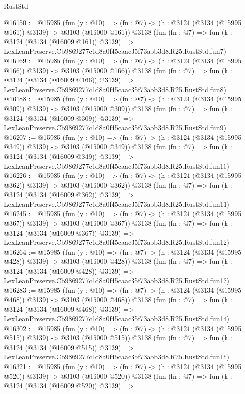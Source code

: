 \begin{lexlean}{RustStd}
\begin{coremodule}
@16150 := @15985
    (fun (y : @10) => (fn : @7) -> (h : @3124 (@3134 (@15995 @161)) @3139) -> @3103 (@16000 @161))
    @3138
    (fun (fn : @7) =>
    fun (h : @3124 (@3134 (@16009 @161)) @3139) =>
    LexLeanPreserve.Cb9869277c1d8a0f45caac35f73abb3d8.R25.RustStd.fun7)
@16169 := @15985
    (fun (y : @10) => (fn : @7) -> (h : @3124 (@3134 (@15995 @166)) @3139) -> @3103 (@16000 @166))
    @3138
    (fun (fn : @7) =>
    fun (h : @3124 (@3134 (@16009 @166)) @3139) =>
    LexLeanPreserve.Cb9869277c1d8a0f45caac35f73abb3d8.R25.RustStd.fun8)
@16188 := @15985
    (fun (y : @10) => (fn : @7) -> (h : @3124 (@3134 (@15995 @309)) @3139) -> @3103 (@16000 @309))
    @3138
    (fun (fn : @7) =>
    fun (h : @3124 (@3134 (@16009 @309)) @3139) =>
    LexLeanPreserve.Cb9869277c1d8a0f45caac35f73abb3d8.R25.RustStd.fun9)
@16207 := @15985
    (fun (y : @10) => (fn : @7) -> (h : @3124 (@3134 (@15995 @349)) @3139) -> @3103 (@16000 @349))
    @3138
    (fun (fn : @7) =>
    fun (h : @3124 (@3134 (@16009 @349)) @3139) =>
    LexLeanPreserve.Cb9869277c1d8a0f45caac35f73abb3d8.R25.RustStd.fun10)
@16226 := @15985
    (fun (y : @10) => (fn : @7) -> (h : @3124 (@3134 (@15995 @362)) @3139) -> @3103 (@16000 @362))
    @3138
    (fun (fn : @7) =>
    fun (h : @3124 (@3134 (@16009 @362)) @3139) =>
    LexLeanPreserve.Cb9869277c1d8a0f45caac35f73abb3d8.R25.RustStd.fun11)
@16245 := @15985
    (fun (y : @10) => (fn : @7) -> (h : @3124 (@3134 (@15995 @367)) @3139) -> @3103 (@16000 @367))
    @3138
    (fun (fn : @7) =>
    fun (h : @3124 (@3134 (@16009 @367)) @3139) =>
    LexLeanPreserve.Cb9869277c1d8a0f45caac35f73abb3d8.R25.RustStd.fun12)
@16264 := @15985
    (fun (y : @10) => (fn : @7) -> (h : @3124 (@3134 (@15995 @428)) @3139) -> @3103 (@16000 @428))
    @3138
    (fun (fn : @7) =>
    fun (h : @3124 (@3134 (@16009 @428)) @3139) =>
    LexLeanPreserve.Cb9869277c1d8a0f45caac35f73abb3d8.R25.RustStd.fun13)
@16283 := @15985
    (fun (y : @10) => (fn : @7) -> (h : @3124 (@3134 (@15995 @468)) @3139) -> @3103 (@16000 @468))
    @3138
    (fun (fn : @7) =>
    fun (h : @3124 (@3134 (@16009 @468)) @3139) =>
    LexLeanPreserve.Cb9869277c1d8a0f45caac35f73abb3d8.R25.RustStd.fun14)
@16302 := @15985
    (fun (y : @10) => (fn : @7) -> (h : @3124 (@3134 (@15995 @515)) @3139) -> @3103 (@16000 @515))
    @3138
    (fun (fn : @7) =>
    fun (h : @3124 (@3134 (@16009 @515)) @3139) =>
    LexLeanPreserve.Cb9869277c1d8a0f45caac35f73abb3d8.R25.RustStd.fun15)
@16321 := @15985
    (fun (y : @10) => (fn : @7) -> (h : @3124 (@3134 (@15995 @520)) @3139) -> @3103 (@16000 @520))
    @3138
    (fun (fn : @7) =>
    fun (h : @3124 (@3134 (@16009 @520)) @3139) =>

\end{coremodule}
\end{lexlean}
